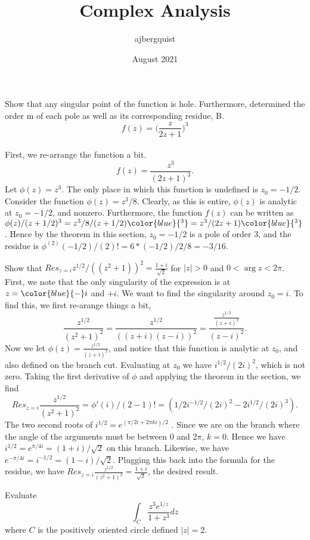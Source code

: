\documentclass{article}
\title{Complex Analysis}
\author{ajbergquist }
\date{August 2021}
\theoremstyle{definition}
\newcommand{\cs}[1]{\color{blue}{#1}\normalcolor}
\begin{document}
 Show that any singular point of the function is  hole. Furthermore, determined the order m of each pole as well as its corresponding residue, B.
$$f(z) = \Big(\frac{z}{2z+1}\Big)^3$$
\\

 First, we re-arrange the function a bit. 
$$f(z) = \frac{z^3}{(2z+1)^3}.$$ Let $\phi(z) = z^3$. The only place in which this function is undefined is $z_0 = -1/2$. Consider the function $\phi(z) = z^3/8$. Clearly, as this is entire, $\phi(z)$ is analytic at $z_0 = -1/2$, and nonzero. Furthermore, the function $f(z)$ can be written as $\phi(z)/(z+1/2)^3 = z^3/8/(z + 1/2)\cs{^3} = z^3/(2z + 1)\cs{^3}$. Hence by the theorem in this section, $z_0 = -1/2$ is a pole of order $3$, and the residue is $\phi^{(2)}(-1/2)/(2)! = 6*(-1/2)/2/8 = -3/16$.\\

\cs{5/5}

 Show that $Res_{z = i}{z^{1/2}}/((z^2+1))^2 = \frac{1+ i}{\sqrt{2}}$ for $|z| > 0 $ and $0 < \arg z < 2\pi$.\\

 First, we note that the only singularity of the expression is at $z=\cs{-}i$ and $+i$. We want to find the singularity around $z_0 = i$. To find this, we first re-arange things a bit,
$$\frac{z^{1/2}}{(z^2 + 1)^2} = \frac{z^{1/2}}{((z+i)(z-i))^2} = \frac{\frac{z^{1/2}}{(z+i)^2}}{(z-i)^2}.$$ Now we let $\phi(z) = \frac{z^{1/2}}{(z+i)^2}$, and notice that this function is analytic at $z_0$, and also defined on the branch cut. Evaluating at $z_0$ we have $i^{1/2}/(2i)^2$, which is not zero. Taking the first derivative of $\phi$ and applying the theorem in the section, we find
$$Res_{z = i}\frac{z^{1/2}}{(z^2 + 1)^2} = \phi'(i)/(2-1)! = (1/2i^{-1/2}/(2i)^2 -2i^{1/2}/(2i)^3).$$ The two second roots of $i^{1/2} = e^{(\pi/2 i + 2\pi ki)/2}$ . Since we are on the branch where the angle of the arguments must be between 0 and 2$\pi$, $k = 0$. Hence we have $i^{1/2} = e^{\pi/4 i} = (1+i)/\sqrt{2}$ on this branch. Likewise, we have $e^{-\pi/4i} = i^{-1/2} = (1-i)/\sqrt{2}$. Plugging this back into the formula for the residue, we have $Res_{z = i}\frac{z^{1/2}}{(z^2 + 1)^2} = \frac{1+ i}{\sqrt{2}}$, the desired result. \cs{It isn't quite the desired result... There is some error in the simplifying of that messy expression.}\\

\cs{4.5/5}

 Evaluate
$$\int_C\frac{z^3e^{1/z}}{1+z^3}dz$$ where $C$ is the positively oriented circle defined $|z| = 2$.\\
\end{document}
